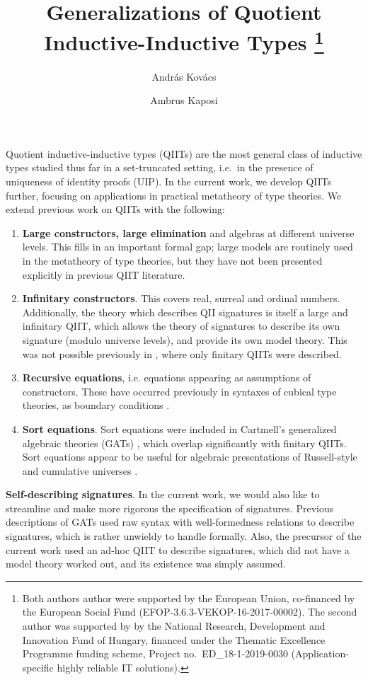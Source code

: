 \documentclass{easychair}
\title{Generalizations of Quotient Inductive-Inductive Types %
  \thanks{Both authors author were supported by the European Union, co-financed
    by the European Social Fund (EFOP-3.6.3-VEKOP-16-2017-00002). The second
    author was supported by by the National Research, Development and Innovation
    Fund of Hungary, financed under the Thematic Excellence Programme funding
    scheme, Project no.\ ED\_18-1-2019-0030 (Application-specific highly
    reliable IT solutions). }}
\author{
Andr\'as Kov\'acs
\and
Ambrus Kaposi
}
\institute{
  E\"otv\"os Lor\'and University,
  Budapest, Hungary \\
  \email{kovacsandras|akaposi@inf.elte.hu}
}
\begin{document}
\maketitle

Quotient inductive-inductive types (QIITs) are the most general class of
inductive types studied thus far in a set-truncated setting, i.e.\ in the
presence of uniqueness of identity proofs (UIP). In the current work, we develop
QIITs further, focusing on applications in practical metatheory of type
theories. We extend previous work on QIITs \cite{kaposi2019constructing} with
the following:
\begin{enumerate}
  \item
  \textbf{Large constructors, large elimination} and algebras at different
  universe levels. This fills in an important formal gap; large models are
  routinely used in the metatheory of type theories, but they have not been
  presented explicitly in previous QIIT literature.
  \item
  \textbf{Infinitary constructors}.
  This covers real, surreal \cite{HoTTbook} and ordinal numbers. Additionally,
  the theory which describes QII signatures is itself a large and infinitary
  QIIT, which allows the theory of signatures to describe its own signature
  (modulo universe levels), and provide its own model theory. This was not
  possible previously in \cite{kaposi2019constructing}, where only finitary
  QIITs were described.
  \item
  \textbf{Recursive equations}, i.e. equations appearing as assumptions of
  constructors. These have occurred previously in syntaxes of cubical type
  theories, as boundary conditions \cite{cohen2016cubical,
    angiuli2016computational, angiuli2018cartesian}.
  \item
  \textbf{Sort equations}. Sort equations were included in Cartmell's
  generalized algebraic theories (GATs) \cite{gat}, which overlap significantly
  with finitary QIITs. Sort equations appear to be useful for algebraic
  presentations of Russell-style and cumulative universes
  \cite{sterling2019algebraic}.
\end{enumerate}

\textbf{Self-describing signatures}. In the current work, we
would also like to streamline and make more rigorous the specification of
signatures. Previous descriptions of GATs \cite{gat, sterling2019algebraic} used
raw syntax with well-formedness relations to describe signatures, which is
rather unwieldy to handle formally. Also, the precursor of the current work
\cite{kaposi2019constructing} used an ad-hoc QIIT to describe signatures, which
did not have a model theory worked out, and its existence was simply assumed.
\end{document}

